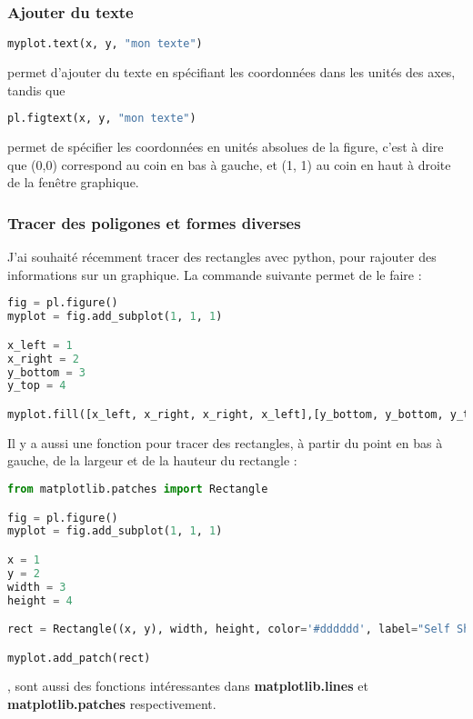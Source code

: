 \documentclass[a4paper,twoside]{article}
\begin{document}
\subsubsection{Ajouter du texte}
\begin{lstlisting}[language=python]
myplot.text(x, y, "mon texte")
\end{lstlisting}
permet d'ajouter du texte en spécifiant les coordonnées dans les unités des axes, tandis que
\begin{lstlisting}[language=python]
pl.figtext(x, y, "mon texte")
\end{lstlisting}
permet de spécifier les coordonnées en unités absolues de la figure, c'est à dire que (0,0) correspond au coin en bas à gauche, et (1, 1) au coin en haut à droite de la fenêtre graphique.

\subsubsection{Tracer des poligones et formes diverses}
J'ai souhaité récemment tracer des rectangles avec python, pour rajouter des informations sur un graphique. La commande suivante permet de le faire :
\begin{lstlisting}[language=python]
fig = pl.figure()
myplot = fig.add_subplot(1, 1, 1)

x_left = 1
x_right = 2
y_bottom = 3
y_top = 4

myplot.fill([x_left, x_right, x_right, x_left],[y_bottom, y_bottom, y_top, y_top], fill=False, hatch='\\')
\end{lstlisting}

Il y a aussi une fonction pour tracer des rectangles, à partir du point en bas à gauche, de la largeur et de la hauteur du rectangle : 
\begin{lstlisting}[language=python]
from matplotlib.patches import Rectangle

fig = pl.figure()
myplot = fig.add_subplot(1, 1, 1)

x = 1
y = 2
width = 3
height = 4

rect = Rectangle((x, y), width, height, color='#dddddd', label="Self Shadowing")

myplot.add_patch(rect)
\end{lstlisting}

\bigskip

,  sont aussi des fonctions intéressantes dans \textbf{matplotlib.lines} et \textbf{matplotlib.patches}
respectivement. 
\end{document}
